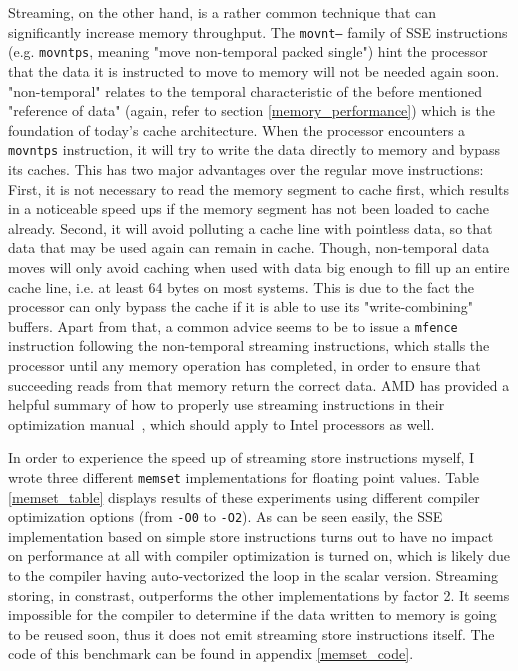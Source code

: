 Streaming, on the other hand, is a rather common technique that can significantly increase memory throughput. The \texttt{movnt--} family of SSE instructions (e.g. \texttt{movntps}, meaning "move non-temporal packed single") hint the processor that the data it is instructed to move to memory will not be needed again soon. "non-temporal" relates to the temporal characteristic of the before mentioned "reference of data" (again, refer to section \ref{memory_performance}) which is the foundation of today's cache architecture. When the processor encounters a \texttt{movntps} instruction, it will try to write the data directly to memory and bypass its caches. This has two major advantages over the regular move instructions: First, it is not necessary to read the memory segment to cache first, which results in a noticeable speed ups if the memory segment has not been loaded to cache already. Second, it will avoid polluting a cache line with pointless data, so that data that may be used again can remain in cache. Though, non-temporal data moves will only avoid caching when used with data big enough to fill up an entire cache line, i.e. at least 64 bytes on most systems. This is due to the fact the processor can only bypass the cache if it is able to use its "write-combining" buffers. Apart from that, a common advice seems to be to issue a \texttt{mfence} instruction following the non-temporal streaming instructions, which stalls the processor until any memory operation has completed, in order to ensure that succeeding reads from that memory return the correct data. AMD has provided a helpful summary of how to properly use streaming instructions in their optimization manual~\cite[pp. 106ff, 231ff]{amd2012optimization}, which should apply to Intel processors as well. 

In order to experience the speed up of streaming store instructions myself, I wrote three different \texttt{memset} implementations for floating point values. Table \ref{memset_table} displays results of these experiments using different compiler optimization options (from \texttt{-O0} to \texttt{-O2}). As can be seen easily, the SSE implementation based on simple store instructions turns out to have no impact on performance at all with compiler optimization is turned on, which is likely due to the compiler having auto-vectorized the loop in the scalar version. Streaming storing, in constrast, outperforms the other implementations by factor 2. It seems impossible for the compiler to determine if the data written to memory is going to be reused soon, thus it does not emit streaming store instructions itself. The code of this benchmark can be found in appendix \ref{memset_code}.

